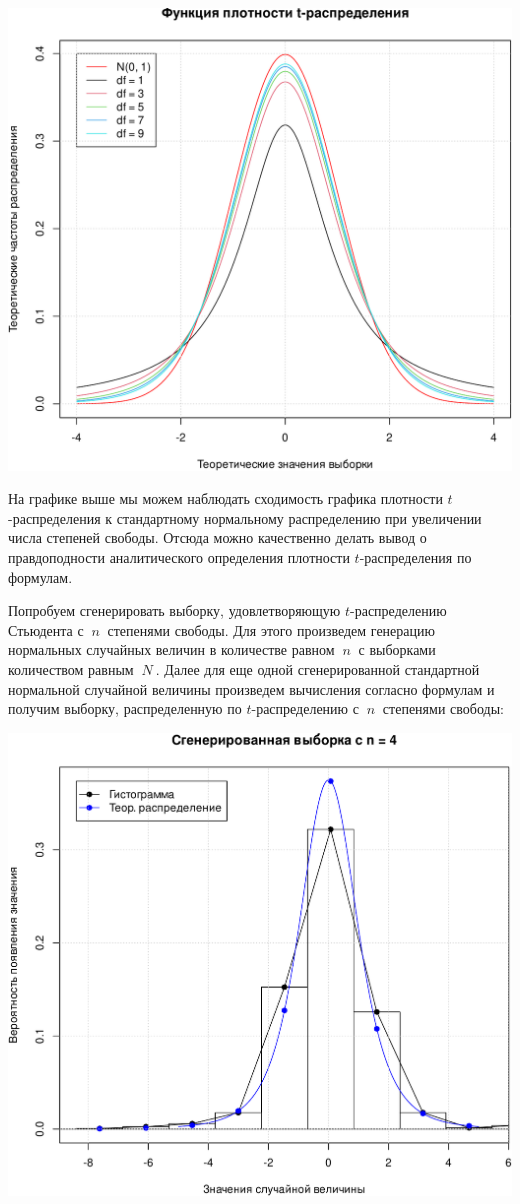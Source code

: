 \documentclass[
]{article}
\begin{document}
\begin{center}\includegraphics[width=0.6\linewidth]{Prac4_files/figure-latex/unnamed-chunk-9-1} \end{center}

На графике выше мы можем наблюдать сходимость графика плотности
\(t\)-распределения к стандартному нормальному распределению при
увеличении числа степеней свободы. Отсюда можно качественно делать вывод
о правдоподности аналитического определения плотности
\(t\)-распределения по формулам.

Попробуем сгенерировать выборку, удовлетворяющую \(t\)-распределению
Стьюдента с \(\ n\ \) степенями свободы. Для этого произведем генерацию
нормальных случайных величин в количестве равном \(\ n\ \) с выборками
количеством равным \(\ N\ \). Далее для еще одной сгенерированной
стандартной нормальной случайной величины произведем вычисления согласно
формулам и получим выборку, распределенную по \(t\)-распределению с
\(\ n\ \) степенями свободы:

\begin{center}\includegraphics[width=0.6\linewidth]{Prac4_files/figure-latex/unnamed-chunk-10-1} \end{center}
\end{document}
